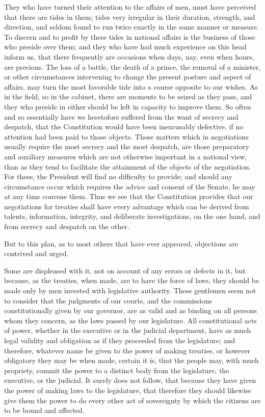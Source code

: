 They who have turned their attention to the affairs of men, must have perceived that there are tides in them; tides very irregular in their duration, strength, and direction, and seldom found to run twice exactly in the same manner or measure. 
To discern and to profit by these tides in national affairs is the business of those who preside over them; and they who have had much experience on this head inform us, that there frequently are occasions when days, nay, even when hours, are precious. 
The loss of a battle, the death of a prince, the removal of a minister, or other circumstances intervening to change the present posture and aspect of affairs, may turn the most favorable tide into a course opposite to our wishes. 
As in the field, so in the cabinet, there are moments to be seized as they pass, and they who preside in either should be left in capacity to improve them. 
So often and so essentially have we heretofore suffered from the want of secrecy and despatch, that the Constitution would have been inexcusably defective, if no attention had been paid to those objects. 
Those matters which in negotiations usually require the most secrecy and the most despatch, are those preparatory and auxiliary measures which are not otherwise important in a national view, than as they tend to facilitate the attainment of the objects of the negotiation. 
For these, the President will find no difficulty to provide; and should any circumstance occur which requires the advice and consent of the Senate, he may at any time convene them. 
Thus we see that the Constitution provides that our negotiations for treaties shall have every advantage which can be derived from talents, information, integrity, and deliberate investigations, on the one hand, and from secrecy and despatch on the other.

But to this plan, as to most others that have ever appeared, objections are contrived and urged.

Some are displeased with it, not on account of any errors or defects in it, but because, as the treaties, when made, are to have the force of laws, they should be made only by men invested with legislative authority. 
These gentlemen seem not to consider that the judgments of our courts, and the commissions constitutionally given by our governor, are as valid and as binding on all persons whom they concern, as the laws passed by our legislature. 
All constitutional acts of power, whether in the executive or in the judicial department, have as much legal validity and obligation as if they proceeded from the legislature; and therefore, whatever name be given to the power of making treaties, or however obligatory they may be when made, certain it is, that the people may, with much propriety, commit the power to a distinct body from the legislature, the executive, or the judicial. 
It surely does not follow, that because they have given the power of making laws to the legislature, that therefore they should likewise give them the power to do every other act of sovereignty by which the citizens are to be bound and affected.

